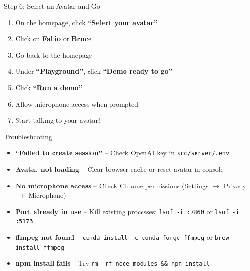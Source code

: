 \documentclass[aspectratio=169]{beamer}
\begin{document}
\begin{frame}{Step 6: Select an Avatar and Go}
\begin{enumerate}
    \setlength\itemsep{0.5cm}
    \item On the homepage, click \textbf{``Select your avatar''}
    \item Click on \textbf{Fabio} or \textbf{Bruce}
    \item Go back to the homepage
    \item Under \textbf{``Playground''}, click \textbf{``Demo ready to go''}
    \item Click \textbf{``Run a demo''}
    \item Allow microphone access when prompted
    \item Start talking to your avatar!
\end{enumerate}
\end{frame}

\begin{frame}{Troubleshooting}
\begin{itemize}
    \setlength\itemsep{0.4cm}
    \item \textbf{``Failed to create session''} -- Check OpenAI key in \texttt{src/server/.env}
    \item \textbf{Avatar not loading} -- Clear browser cache or reset avatar in console
    \item \textbf{No microphone access} -- Check Chrome permissions (Settings $\rightarrow$ Privacy $\rightarrow$ Microphone)
    \item \textbf{Port already in use} -- Kill existing processes: \texttt{lsof -i :7860} or \texttt{lsof -i :5173}
    \item \textbf{ffmpeg not found} -- \texttt{conda install -c conda-forge ffmpeg} or \texttt{brew install ffmpeg}
    \item \textbf{npm install fails} -- Try \texttt{rm -rf node\_modules \&\& npm install}
\end{itemize}
\end{frame}
\end{document}
